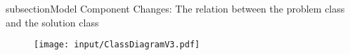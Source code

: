 \*subsection{Model Component}
Changes: The relation between the problem class and the solution class 
	

\begin{figure}[p]%
\texttt{[image: input/ClassDiagramV3.pdf]}%
\label{fig:modelcomponent}
\end{figure}

